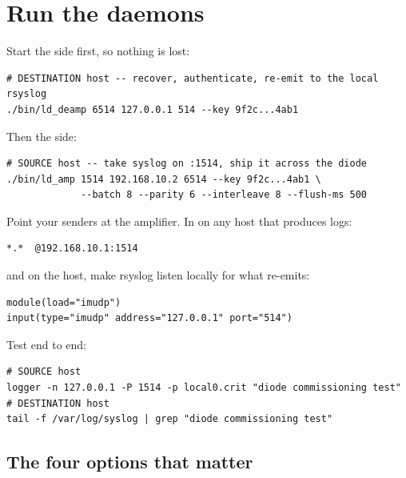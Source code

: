 \documentclass[11pt,a4paper]{article}
\renewcommand{\deamp}{\prog{ld\_deamp}}
\begin{document}
\section{Run the daemons}

Start the \dstside{} side first, so nothing is lost:

\begin{lstlisting}[style=shell]
# DESTINATION host -- recover, authenticate, re-emit to the local rsyslog
./bin/ld_deamp 6514 127.0.0.1 514 --key 9f2c...4ab1
\end{lstlisting}

Then the \srcside{} side:

\begin{lstlisting}[style=shell]
# SOURCE host -- take syslog on :1514, ship it across the diode
./bin/ld_amp 1514 192.168.10.2 6514 --key 9f2c...4ab1 \
             --batch 8 --parity 6 --interleave 8 --flush-ms 500
\end{lstlisting}

Point your senders at the amplifier. In  on any host
that produces logs:

\begin{lstlisting}[style=conf]
*.*  @192.168.10.1:1514
\end{lstlisting}

and on the \dstside{} host, make rsyslog listen locally for what \deamp{}
re-emits:

\begin{lstlisting}[style=conf,caption={\file{/etc/rsyslog.d/10-diode-in.conf} --- DESTINATION host}]
module(load="imudp")
input(type="imudp" address="127.0.0.1" port="514")
\end{lstlisting}

Test end to end:

\begin{lstlisting}[style=shell]
# SOURCE host
logger -n 127.0.0.1 -P 1514 -p local0.crit "diode commissioning test"
# DESTINATION host
tail -f /var/log/syslog | grep "diode commissioning test"
\end{lstlisting}

\subsection{The four options that matter}
\end{document}
